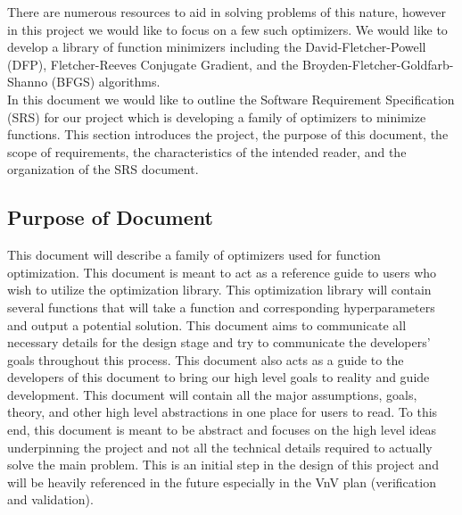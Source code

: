 \documentclass[12pt]{article}
\begin{document}
There are numerous resources to aid in solving problems of this nature, however in this project we would like to focus on a few such optimizers. We would like to develop a library of function minimizers including the David-Fletcher-Powell (DFP), Fletcher-Reeves Conjugate Gradient, and the Broyden-Fletcher-Goldfarb-Shanno (BFGS) algorithms. 
\\

In this document we would like to outline the Software Requirement Specification (SRS) for our project which is developing a family of optimizers to minimize functions. This section introduces the project, the purpose of this document, the scope of requirements, the characteristics of the intended reader, and the organization of the SRS document.



\subsection{Purpose of Document}

This document will describe a family of optimizers used for function optimization. This document is meant to act as a reference guide to users who wish to utilize the optimization library. This optimization library will contain several functions that will take a function and corresponding hyperparameters and output a potential solution. This document aims to communicate all necessary details for the design stage and try to communicate the developers' goals throughout this process. This document also acts as a guide to the developers of this document to bring our high level goals to reality and guide development. This document will contain all the major assumptions, goals, theory, and other high level abstractions in one place for users to read. To this end, this document is meant to be abstract and focuses on the high level ideas underpinning the project and not all the technical details required to actually solve the main problem. This is an initial step in the design of this project and will be heavily referenced in the future especially in the VnV plan (verification and validation).

  
\end{document}

